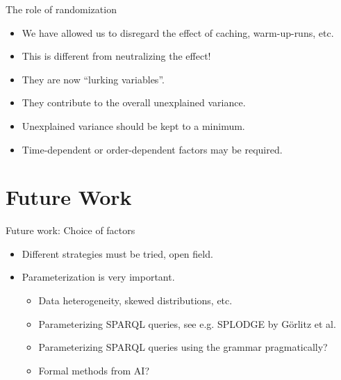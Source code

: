 \documentclass[english,usenames,dvipsnames,aspectratio=169]{beamer}
\begin{document}
\begin{frame}{The role of randomization}
  \begin{itemize}
  \item We have allowed us to disregard the effect of caching,
    warm-up-runs, etc.
  \item This is different from neutralizing the effect!
  \item They are now ``lurking variables''.
  \item They contribute to the overall unexplained variance.
  \item Unexplained variance should be kept to a minimum.
  \item Time-dependent or order-dependent factors may be required.
  \end{itemize}
\end{frame}

\section{Future Work}

\begin{frame}{Future work: Choice of factors}

  \begin{itemize}
  \item Different strategies must be tried, open field.
  \item Parameterization is very important.
    \begin{itemize}
    \item Data heterogeneity, skewed distributions, etc.
    \item Parameterizing SPARQL queries, see e.g. SPLODGE by Görlitz
      et al.
    \item Parameterizing SPARQL queries using the grammar pragmatically?
    \item Formal methods from AI?
    \end{itemize}
  \end{itemize}
  
\end{frame}
\end{document}
